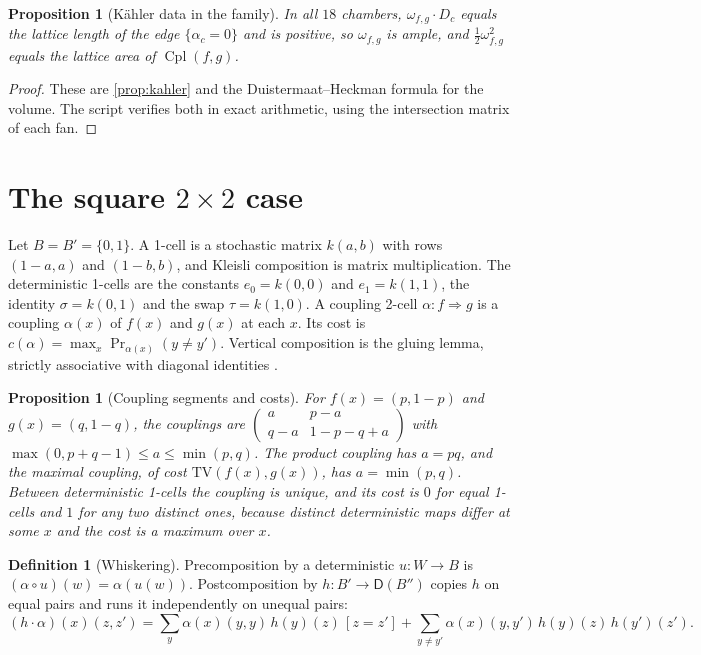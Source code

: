 \documentclass[11pt]{article}
\newtheorem{proposition}[theorem]{Proposition}
\theoremstyle{definition}
\newtheorem{definition}[theorem]{Definition}
\theoremstyle{remark}
\newcommand{\D}{\mathsf{D}}
\newcommand{\Cpl}{\operatorname{Cpl}}
\newcommand{\TV}{\mathrm{TV}}
\begin{document}
\begin{proposition}[Kähler data in the family]\label{prop:kahler2x3}
In all $18$ chambers, $\omega_{f,g}\cdot D_c$ equals the lattice length of the edge $\{\alpha_c=0\}$ and is
positive, so $\omega_{f,g}$ is ample, and $\tfrac12\omega_{f,g}^2$ equals the lattice area of $\Cpl(f,g)$.
\end{proposition}
\begin{proof}
These are \cref{prop:kahler} and the Duistermaat--Heckman formula for the volume. The script verifies
both in exact arithmetic, using the intersection matrix of each fan.
\end{proof}

\section{The square $2\times2$ case}\label{sec:square}

Let $B=B'=\{0,1\}$. A 1-cell is a stochastic matrix $k(a,b)$ with rows $(1-a,a)$ and $(1-b,b)$, and
Kleisli composition is matrix multiplication. The deterministic 1-cells are the constants $e_0=k(0,0)$
and $e_1=k(1,1)$, the identity $\sigma=k(0,1)$ and the swap $\tau=k(1,0)$. A coupling 2-cell
$\alpha\colon f\Rightarrow g$ is a coupling $\alpha(x)$ of $f(x)$ and $g(x)$ at each $x$. Its cost is
$c(\alpha)=\max_x\Pr_{\alpha(x)}(y\ne y')$. Vertical composition is the gluing lemma, strictly associative
with diagonal identities \cite[Thm.~2.3]{Conditionals}.

\begin{proposition}[Coupling segments and costs]\label{prop:segment}
For $f(x)=(p,1-p)$ and $g(x)=(q,1-q)$, the couplings are
$\left(\begin{smallmatrix}a&p-a\\q-a&1-p-q+a\end{smallmatrix}\right)$ with
$\max(0,p+q-1)\le a\le\min(p,q)$. The product coupling has $a=pq$, and the maximal coupling, of cost
$\TV(f(x),g(x))$, has $a=\min(p,q)$. Between deterministic 1-cells the coupling is unique, and its cost is
$0$ for equal 1-cells and $1$ for any two distinct ones, because distinct deterministic maps differ at some
$x$ and the cost is a maximum over $x$.
\end{proposition}

\begin{definition}[Whiskering]\label{def:whisker}
Precomposition by a deterministic $u\colon W\to B$ is $(\alpha\circ u)(w)=\alpha(u(w))$. Postcomposition by
$h\colon B'\to\D(B'')$ copies $h$ on equal pairs and runs it independently on unequal pairs:
\[
(h\cdot\alpha)(x)(z,z')=\sum_y\alpha(x)(y,y)\,h(y)(z)\,[z=z']+\sum_{y\ne y'}\alpha(x)(y,y')\,h(y)(z)\,h(y')(z').
\]
\end{definition}
\end{document}
